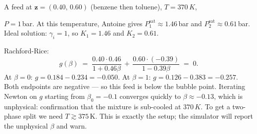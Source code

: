 \documentclass[11pt,a4paper]{article}
\newcommand{\Psat}{P^{\mathrm{sat}}}
\newcommand{\zv}{\mathbf{z}}
\begin{document}
\begin{example}
A feed at $\zv = (0.40,\, 0.60)$ (benzene then toluene), $T = 370\,K$,


$P = 1\,$bar.  At this temperature, Antoine gives
$\Psat_1 \approx 1.46\,$bar and $\Psat_2 \approx 0.61\,$bar. Ideal
solution: $\gamma_i = 1$, so $K_1 = 1.46$ and $K_2 = 0.61$.

Rachford-Rice:
\[
   g(\beta) \;=\; \frac{0.40 \cdot 0.46}{1 + 0.46 \beta} \,+\,
                  \frac{0.60 \cdot (-0.39)}{1 - 0.39 \beta} \;=\; 0.
\]
At $\beta = 0$: $g = 0.184 - 0.234 = -0.050$. At $\beta = 1$:
$g = 0.126 - 0.383 = -0.257$. Both endpoints are negative --- so this
feed is below the bubble point. Iterating Newton on $g$ starting from
$\beta_0 = -0.1$ converges quickly to $\beta \approx -0.13$, which is
unphysical: confirmation that the mixture is sub-cooled at $370\,K$. To
get a two-phase split we need $T \gtrsim 375\,$K. This is exactly the
 setup; the simulator will report the
unphysical $\beta$ and warn.
\end{example}
\end{document}
